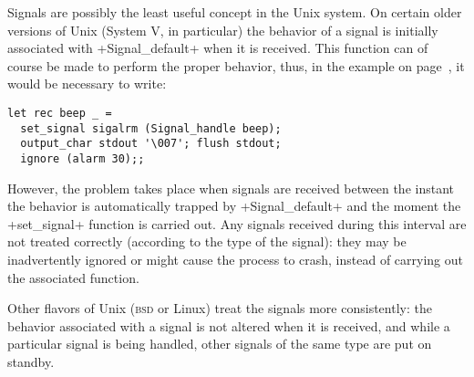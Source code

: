 Signals are possibly the least useful concept in the Unix system.  On
certain older versions of Unix (System V, in particular) the behavior
of a signal is initially associated with
\ml+Signal_default+ when it is received.  This function can of course
be made to perform the proper behavior, thus, in the 
example on page~\pageref{ex/beep}, it would be necessary to write:

\begin{lstlisting}
let rec beep _ =
  set_signal sigalrm (Signal_handle beep);
  output_char stdout '\007'; flush stdout;
  ignore (alarm 30);;
\end{lstlisting}

However, the problem takes place when signals are received between the
instant the behavior is automatically trapped by \ml+Signal_default+
and the moment the \ml+set_signal+ function is carried out.  
Any signals received during this interval are not treated correctly 
(according to the type of the signal): they may be inadvertently 
ignored or might cause the process to crash, instead of carrying 
out the associated function.

Other flavors of Unix (\textsc{bsd} or Linux) treat the 
signals more consistently: the behavior associated with a 
signal is not altered when it is received, and while a particular 
signal is being handled, other signals of the same type are put on standby.

